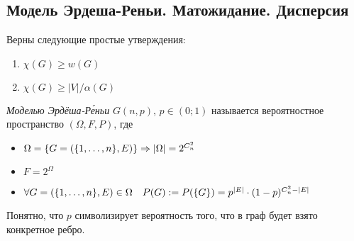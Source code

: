 \subsection{Модель Эрдеша-Реньи. Матожидание. Дисперсия}

\begin{proposition}
	Верны следующие простые утверждения:
	\begin{enumerate}
		\item \(\chi(G) \ge w(G)\)
		
		\item \(\chi(G) \ge |V| / \alpha(G)\)
	\end{enumerate}
\end{proposition}

\begin{definition}
	\textit{Моделью Эрдёша-Р\'{е}ньи} $G(n, p)$, $p \in (0; 1)$ называется вероятностное пространство $(\Omega, F, P)$, где
	\begin{itemize}
		\item \(\Omega = \{G = (\{1, \ldots, n\}, E)\} \Rightarrow |\Omega| = 2^{C_n^2}\)
		
		\item \(F = 2^\Omega\)
		
		\item \(\forall G = (\{1, \ldots, n\}, E) \in \Omega \quad P(G) := P(\{G\}) = p^{|E|} \cdot (1 - p)^{C_n^2 - |E|}\)
	\end{itemize}
\end{definition}

\begin{note}
	Понятно, что $p$ символизирует вероятность того, что в граф будет взято конкретное ребро.
\end{note}

